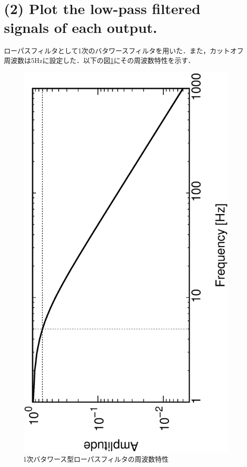 \documentclass[a4j]{jsarticle}
\begin{document}
\section*{(2) Plot the low-pass filtered signals of each output.}
ローパスフィルタとして1次のバタワースフィルタを用いた．また，カットオフ周波数は5Hzに設定した．以下の図\ref{lpf}にその周波数特性を示す．
\begin{figure}[H]
 \centering
 \vspace{-1cm}
 \hspace{-1cm}
 \includegraphics[angle=-90,scale=0.33]{H_spec.eps}
 \caption{1次バタワース型ローパスフィルタの周波数特性}
 \label{lpf}
\end{figure}
\vspace{-1cm}
%
\end{document}
